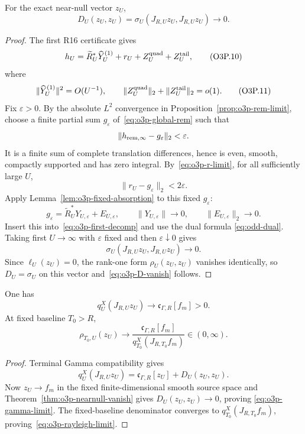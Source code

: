 \begin{theorem}
\label{thm:o3p-nearnull-vanish}
For the exact near-null vector $z_U$,
\[
 \boxed{
 D_U(z_U,z_U)
 =\sigma_U(J_{R,U}z_U,J_{R,U}z_U)
 \longrightarrow0.
 }
\tag{O3P.9}\label{eq:o3p-D-vanish}
\]
\end{theorem}

\begin{proof}
The first R16 certificate gives
\[
 h_U
 =\widetilde R_U^*\widehat Y_U^{(1)}
 +r_U+Z_U^{\rm quad}+Z_U^{\rm tail},
\tag{O3P.10}\label{eq:o3p-first-decomp}
\]
where
\[
 \|\widehat Y_U^{(1)}\|^2=O(U^{-1}),
 \qquad
 \|Z_U^{\rm quad}\|_2+\|Z_U^{\rm tail}\|_2=o(1).
\tag{O3P.11}\label{eq:o3p-first-cost}
\]
Fix $\varepsilon>0$.  By the absolute $L^2$ convergence in
Proposition~\ref{prop:o3p-rem-limit}, choose a finite partial sum
$g_\varepsilon$ of~\eqref{eq:o3p-global-rem} such that
\[
 \|h_{\rm rem,\infty}-g_\varepsilon\|_2<\varepsilon.
\]
It is a finite sum of complete translation differences, hence is even, smooth,
compactly supported and has zero integral.  By~\eqref{eq:o3p-r-limit}, for all
sufficiently large $U$,
\[
 \|r_U-g_\varepsilon\|_2<2\varepsilon.
\tag{O3P.12}\label{eq:o3p-r-approx}
\]
Apply Lemma~\ref{lem:o3p-fixed-absorption} to this fixed $g_\varepsilon$:
\[
 g_\varepsilon=\widetilde R_U^*Y_{U,\varepsilon}+E_{U,\varepsilon},
 \qquad
 \|Y_{U,\varepsilon}\|\to0,
 \qquad
 \|E_{U,\varepsilon}\|_2\to0.
\]
Insert this into~\eqref{eq:o3p-first-decomp} and use the dual formula
\eqref{eq:odd-dual}.  Taking first $U\to\infty$ with $\varepsilon$ fixed and then
$\varepsilon\downarrow0$ gives
\[
 \sigma_U(J_{R,U}z_U,J_{R,U}z_U)\to0.
\]
Since $\ell_U(z_U)=0$, the rank-one form $\rho_U(z_U,z_U)$ vanishes identically, so
$D_U=\sigma_U$ on this vector and~\eqref{eq:o3p-D-vanish} follows.
\end{proof}

\begin{corollary}
\label{cor:o3p-gamma-limit}
One has
\[
 \boxed{
 q_U^X(J_{R,U}z_U)
 \longrightarrow
 \mathfrak c_{\Gamma,R}[f_m]>0.
 }
\tag{O3P.13}\label{eq:o3p-gamma-limit}
\]
At fixed baseline $T_0>R$,
\[
 \boxed{
 \rho_{T_0,U}(z_U)
 \longrightarrow
 \frac{\mathfrak c_{\Gamma,R}[f_m]}
 {q_{T_0}^X(J_{R,T_0}f_m)}\in(0,\infty).
 }
\tag{O3P.14}\label{eq:o3p-rayleigh-limit}
\]
\end{corollary}

\begin{proof}
Terminal Gamma compatibility gives
\[
 q_U^X(J_{R,U}z_U)
 =\mathfrak c_{\Gamma,R}[z_U]+D_U(z_U,z_U).
\]
Now $z_U\to f_m$ in the fixed finite-dimensional smooth source space and
Theorem~\ref{thm:o3p-nearnull-vanish} gives $D_U(z_U,z_U)\to0$, proving
\eqref{eq:o3p-gamma-limit}.  The fixed-baseline denominator converges to
$q_{T_0}^X(J_{R,T_0}f_m)$, proving~\eqref{eq:o3p-rayleigh-limit}.
\end{proof}

